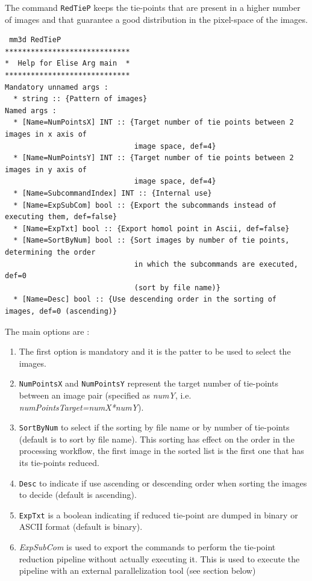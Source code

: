 The command {\tt RedTieP} keeps the tie-points that are present in a higher number of images and that guarantee a good distribution in the pixel-space of the images. 

\begin{verbatim}
 mm3d RedTieP
*****************************
*  Help for Elise Arg main  *
*****************************
Mandatory unnamed args : 
  * string :: {Pattern of images}
Named args : 
  * [Name=NumPointsX] INT :: {Target number of tie points between 2 images in x axis of 
                              image space, def=4}
  * [Name=NumPointsY] INT :: {Target number of tie points between 2 images in y axis of 
                              image space, def=4}
  * [Name=SubcommandIndex] INT :: {Internal use}
  * [Name=ExpSubCom] bool :: {Export the subcommands instead of executing them, def=false}
  * [Name=ExpTxt] bool :: {Export homol point in Ascii, def=false}
  * [Name=SortByNum] bool :: {Sort images by number of tie points, determining the order 
                              in which the subcommands are executed, def=0 
                              (sort by file name)}
  * [Name=Desc] bool :: {Use descending order in the sorting of images, def=0 (ascending)}
\end{verbatim}

The main options are :

\begin{enumerate}
\item The first option is mandatory and it is the patter to be used to select the images.

\item {\tt NumPointsX} and {\tt NumPointsY} represent the target number of tie-points between an image pair (specified as \textit{numY}, i.e. \textit{numPointsTarget=numX*numY}).
   
\item {\tt SortByNum} to select if the sorting by file name or by number of tie-points (default is to sort by file name). This sorting has effect on the order in the processing workflow, the first image in the sorted list is the first one that has its tie-points reduced.

\item {\tt Desc} to indicate if use ascending or descending order when sorting the images to decide (default is ascending).

\item {\tt ExpTxt} is a boolean indicating if reduced tie-point are dumped in binary or ASCII format (default is binary).

\item \textit{ExpSubCom} is used to export the commands to perform the tie-point reduction pipeline without actually executing it. This is used to execute the pipeline with an external parallelization tool (see section below)
\end{enumerate}


